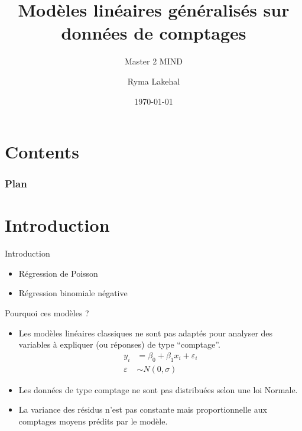\documentclass[aspectratio=1610]{beamer}
\title[HMMA307]
{Modèles linéaires généralisés sur données de comptages}
\subtitle
{Master 2 MIND}
\author[]
{Ryma Lakehal}
\institute
{Faculté des sciences \\
Université de Montpellier
}
\date{\today}
\begin{document}

\begin{frame}
    \titlepage
\end{frame}

\section*{Contents}

\begin{frame}
\frametitle{Plan}
  \tableofcontents
\end{frame}




\section[Intro]{Introduction}
\begin{frame}{Introduction}
\begin{itemize}
    \item Régression de Poisson
    \item Régression binomiale négative
\end{itemize}

\begin{block}{}
Pourquoi ces modèles ?
\end{block}

\begin{itemize}
    \item Les modèles linéaires classiques ne sont pas adaptés pour analyser des variables à expliquer (ou réponses) de type “comptage”.
    \begin{align*}
y_i &= \beta_0 + \beta_1 x_i + \varepsilon_i \\
\varepsilon &\sim N(0, \sigma)
\end{align*}
    \item Les données de type comptage ne sont pas distribuées selon une loi Normale.
    \item La variance des résidus n’est pas constante mais proportionnelle aux comptages moyens prédits par le modèle.
\end{itemize}

\end{frame}

\end{document}
